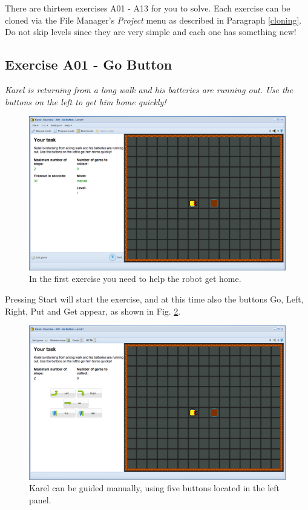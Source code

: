 There are thirteen exercises A01 - A13 for you to solve.
Each exercise can be cloned via the File Manager's 
{\em Project} menu as described in Paragraph \ref{cloning}. 
Do not skip levels since they are very simple and each one has something new! 

\subsection{Exercise A01 - Go Button}

{\em Karel is returning from a long walk and his batteries are running out. 
Use the buttons on the left to get him home quickly! }
\newpage
\begin{figure}[!ht]
\begin{center}
\includegraphics[height=0.4\textwidth]{imgk/a01.png}
\end{center}
\vspace{-4mm}
\caption{In the first exercise you need to help the robot get home.}
\label{fig:a01}
\end{figure}
\noindent
Pressing Start will start 
the exercise, and at this time also the buttons Go, Left, Right, Put and Get appear, 
as shown in Fig. \ref{fig:a01b}.


\begin{figure}[!ht]
\begin{center}
\includegraphics[height=0.4\textwidth]{imgk/a01b.png}
\end{center}
\vspace{-4mm}
\caption{Karel can be guided manually, using five buttons located in the left panel.}
\label{fig:a01b}
\end{figure}

